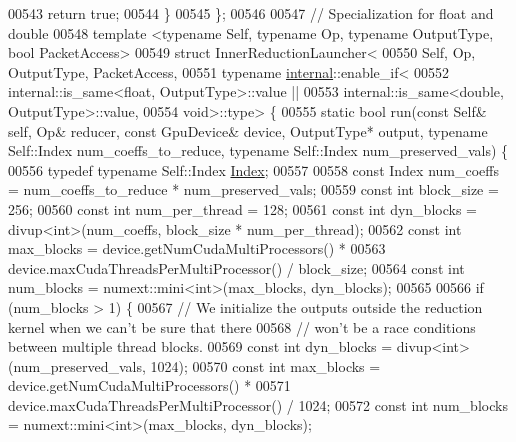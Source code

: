 \begin{DoxyCode}
00543     \textcolor{keywordflow}{return} \textcolor{keyword}{true};
00544   \}
00545 \};
00546 
00547 \textcolor{comment}{// Specialization for float and double}
00548 \textcolor{keyword}{template} <\textcolor{keyword}{typename} Self, \textcolor{keyword}{typename} Op, \textcolor{keyword}{typename} OutputType, \textcolor{keywordtype}{bool} PacketAccess>
00549 \textcolor{keyword}{struct }InnerReductionLauncher<
00550   Self, Op, OutputType, PacketAccess,
00551   typename \hyperlink{namespaceinternal}{internal}::enable\_if<
00552     internal::is\_same<float, OutputType>::value ||
00553     internal::is\_same<double, OutputType>::value,
00554   void>::type> \{
00555   \textcolor{keyword}{static} \textcolor{keywordtype}{bool} run(\textcolor{keyword}{const} Self& \textcolor{keyword}{self}, Op& reducer, \textcolor{keyword}{const} GpuDevice& device, OutputType* output, \textcolor{keyword}{typename} 
      Self::Index num\_coeffs\_to\_reduce, \textcolor{keyword}{typename} Self::Index num\_preserved\_vals) \{
00556     \textcolor{keyword}{typedef} \textcolor{keyword}{typename} Self::Index \hyperlink{namespace_eigen_a62e77e0933482dafde8fe197d9a2cfde}{Index};
00557 
00558     \textcolor{keyword}{const} Index num\_coeffs = num\_coeffs\_to\_reduce * num\_preserved\_vals;
00559     \textcolor{keyword}{const} \textcolor{keywordtype}{int} block\_size = 256;
00560     \textcolor{keyword}{const} \textcolor{keywordtype}{int} num\_per\_thread = 128;
00561     \textcolor{keyword}{const} \textcolor{keywordtype}{int} dyn\_blocks = divup<int>(num\_coeffs, block\_size * num\_per\_thread);
00562     \textcolor{keyword}{const} \textcolor{keywordtype}{int} max\_blocks = device.getNumCudaMultiProcessors() *
00563                            device.maxCudaThreadsPerMultiProcessor() / block\_size;
00564     \textcolor{keyword}{const} \textcolor{keywordtype}{int} num\_blocks = numext::mini<int>(max\_blocks, dyn\_blocks);
00565 
00566     \textcolor{keywordflow}{if} (num\_blocks > 1) \{
00567       \textcolor{comment}{// We initialize the outputs outside the reduction kernel when we can't be sure that there}
00568       \textcolor{comment}{// won't be a race conditions between multiple thread blocks.}
00569       \textcolor{keyword}{const} \textcolor{keywordtype}{int} dyn\_blocks = divup<int>(num\_preserved\_vals, 1024);
00570       \textcolor{keyword}{const} \textcolor{keywordtype}{int} max\_blocks = device.getNumCudaMultiProcessors() *
00571                            device.maxCudaThreadsPerMultiProcessor() / 1024;
00572       \textcolor{keyword}{const} \textcolor{keywordtype}{int} num\_blocks = numext::mini<int>(max\_blocks, dyn\_blocks);

\end{DoxyCode}
